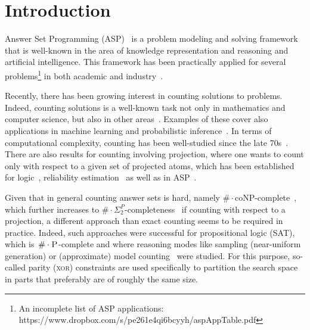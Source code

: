 \documentclass{svproc}
\renewcommand{\P}{\ensuremath{\textsc{P}}\xspace}
\newcommand{\cnt}[0]{\ensuremath{\#}}
\newcommand{\cntc}[0]{\ensuremath{\cnt\cdot}}
\newcommand{\XOR}{\textsc{xor}} %
\begin{document}
\section{Introduction} \label{sec:introduction}
%
Answer Set Programming (ASP)~\cite{Lifschitz99,BrewkaEiterTruszczynski11,GebserKaminskiKaufmannSchaub12} is a
problem modeling and solving framework that is well-known in the area
of knowledge representation and reasoning and artificial intelligence.
%
This framework has been practically applied for several
problems\footnote{An incomplete list of ASP applications:\\ https://www.dropbox.com/s/pe261e4qi6bcyyh/aspAppTable.pdf} in both academic and industry~\cite{BalducciniGelfondNogueira06a,NiemelaSimonsSoininen99,NogueiraBalducciniGelfond01a,GuziolowskiEtAl13a,SchaubWoltran18}.
%

Recently, there has been growing interest in counting solutions to problems.
%
Indeed, counting solutions is a well-known task not only in mathematics and computer
science, but also in other
areas~\cite{ChakrabortyMeelVardi16a,DomshlakHoffmann07a,GomesKautzSabharwalSelman08a,SangBeameKautz05a}.
%
%
%
Examples of these cover also applications in machine learning and probabilistic inference~\cite{ChaviraDarwiche08a}.
%
%
In terms of computational complexity, counting has been well-studied since the
late
70s~\cite{DurandHermannKolaitis05,HemaspaandraVollmer95a,Valiant79,Valiant79b}.
%
There are also results for counting involving projection, where one wants to
count only with respect to a given set of projected atoms,
which has been established for logic~\cite{AzizChuMuise15a,CapelliMengel19,FichteEtAl18,LagniezMarquis19a,GuptaSharmaRoy19a,SharmaRoySoos19a},
reliability estimation~\cite{MeelEtAl17a} as well as
in ASP~\cite{GebserKaufmannSchaub09a,Aziz15a,FichteHecher19}.
%

Given that in general counting answer sets is hard, namely ${\#\cdot\text{coNP}}$-complete~\cite{FichteEtAl17,DurandHermannKolaitis05}, which further increases
to ${\#\cdot\Sigma_2^P}$-completeness~\cite{FichteHecher19} if counting with respect to a projection,
a different approach than exact counting seems to be required in practice.
%
Indeed, such approaches were successful for propositional logic (SAT), which is~$\cntc\P$-complete and where reasoning modes like sampling (near-uniform generation)
or (approximate) model counting~\cite{gosase07a,chmeva13a,ChakrabortyMV13,SharmaRoySoos19a}
were studied.
%
For this purpose, so-called parity (\XOR{}) constraints are used specifically to partition the search space in parts that preferably are of roughly the same size.
\end{document}
